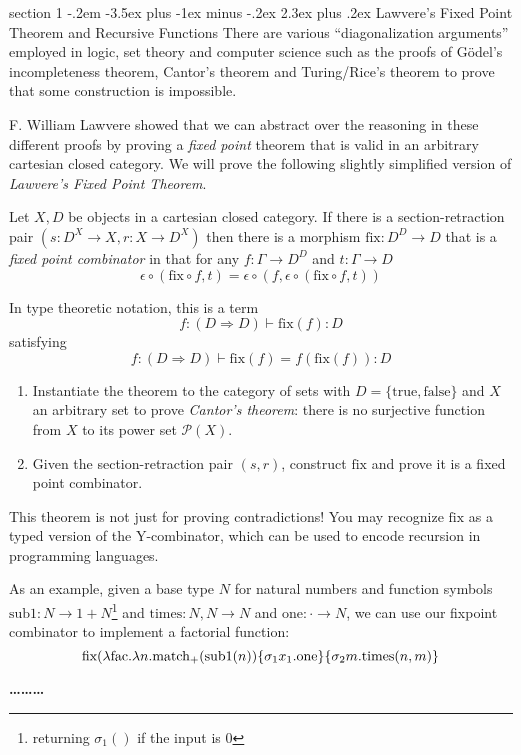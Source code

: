 \documentclass[12pt]{article}
\makeatletter
\newenvironment{problem}{\@startsection
       {section}
       {1}
       {-.2em}
       {-3.5ex plus -1ex minus -.2ex}
       {2.3ex plus .2ex}
       {\pagebreak[3]%
       \large\bf\noindent{Problem }
       }
       }
       {%
       \begin{center}\large\bf \ldots\ldots\ldots\end{center}}
\makeatother
\begin{document}
\begin{problem}{Lawvere's Fixed Point Theorem and Recursive Functions}
  There are various ``diagonalization arguments'' employed in logic,
  set theory and computer science such as the proofs of G\"odel's
  incompleteness theorem, Cantor's theorem and Turing/Rice's theorem
  to prove that some construction is impossible.

  F. William Lawvere showed that we can abstract over the reasoning in
  these different proofs by proving a \emph{fixed point} theorem that
  is valid in an arbitrary cartesian closed category.  We will prove
  the following slightly simplified version of \emph{Lawvere's Fixed
  Point Theorem}.

  Let $X, D$ be objects in a cartesian closed category. If there is a
  section-retraction pair $(s : D^X \to X, r : X \to D^X)$ then there
  is a morphism $\textrm{fix} : D^D \to D$ that is a \emph{fixed point
  combinator} in that for any $f : \Gamma \to D^D$ and $t : \Gamma \to
  D$
  \[ \epsilon\circ( \textrm{fix} \circ f, t) =
     \epsilon\circ(f, \epsilon\circ( \textrm{fix} \circ f, t)) \]

  In type theoretic notation, this is a term
  \[ f: (D \Rightarrow D) \vdash \textrm{fix}(f) : D \]
  satisfying
  \[ f:(D\Rightarrow D) \vdash \textrm{fix}(f) = f(\textrm{fix}(f)) : D \]

  \begin{enumerate}
  \item Instantiate the theorem to the category of sets with $D =
    \{\textrm{true}, \textrm{false} \}$ and $X$ an arbitrary set to
    prove \emph{Cantor's theorem}: there is no surjective function
    from $X$ to its power set $\mathcal P(X)$.

  \item Given the section-retraction pair $(s,r)$, construct
    $\textrm{fix}$ and prove it is a fixed point combinator.
  \end{enumerate}

  This theorem is not just for proving contradictions! You may
  recognize $\textrm{fix}$ as a typed version of the Y-combinator,
  which can be used to encode recursion in programming languages.

  As an example, given a base type $N$ for natural numbers and
  function symbols $\textrm{sub1} : N \to 1 + N$\footnote{returning
  $\sigma_1()$ if the input is $0$} and $\textrm{times} : N, N \to N$
  and $\textrm{one} : \cdot \to N$, we can use our fixpoint combinator
  to implement a factorial function:
  \[ \textrm{fix}(\lambda \textrm{fac}.\lambda n. \textrm{match}_+ {(\textrm{sub1}(n))}\{{\sigma_1x_1. \textrm{one}}\}\{{ \sigma_2 m. \textrm{times}(n,m)}\} \]
\end{problem}
\thispagestyle{empty}


\end{document}
